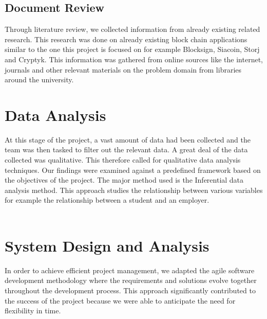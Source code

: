 \subsection{Document Review}
Through literature review, we collected information from already existing related research. This research was done on already existing block chain applications similar to the one this project is focused on for example Blocksign, Siacoin, Storj and Cryptyk. This information was gathered from online sources like the internet, journals and other relevant materials on the problem domain from libraries around the university.


\section{Data Analysis}
At this stage of the project, a vast amount of data had been collected and the team was then tasked to filter out the relevant data. A great deal of the data collected was qualitative. This therefore called for qualitative data analysis techniques. Our findings were examined against a predefined framework based on the objectives of the project. The major method used is the Inferential data analysis method. This approach studies the relationship between various variables for example the relationship between a student and an employer.\\~\\


\section{System Design and Analysis}
In order to achieve efficient project management, we adapted the agile software development methodology where the requirements and solutions evolve together throughout the development process. This approach significantly contributed to the success of the project because we were able to anticipate the need for flexibility in time. 

